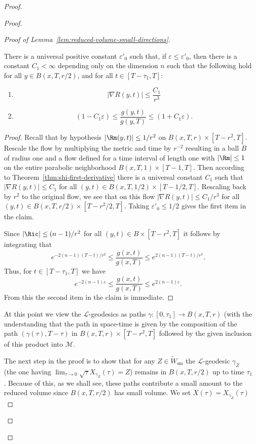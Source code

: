 \begin{proof}
\begin{proof}
\begin{proof}[Proof of Lemma~\ref{lem:reduced-volume-small-directions}]
\begin{claim}\label{claim:scalar-curvature-gradient-metric-bound}
\label{nabR}
There is a universal positive constant $\varepsilon'_0$ such that, if
$\varepsilon\le \varepsilon'_0$, then there is a constant $C_1<\infty$
depending only on the dimension $n$ such that the following hold for all $y\in
B(x,T,r/2)$, and for all $t\in[T-\tau_1,T]$:
\begin{enumerate}
\item[(1)] $$|\nabla R(y,t)|\le \frac{C_1}{r^3}$$
\item[(2)]  $$(1-C_1\varepsilon)\le \frac{g(y,t)}{g(y,T)}\le (1+C_1\varepsilon).$$
\end{enumerate}
\end{claim}

\begin{proof}
Recall that by hypothesis $|\Rm(y,t)|\le 1/r^2$ on
$B(x,T,r)\times [T-r^2,T]$. Rescale the flow by multiplying the
metric and time by $r^{-2}$ resulting in a ball $\widetilde B$ of
radius one and a flow defined for a time interval of length one with
$|\Rm|\le 1$ on the entire parabolic neighborhood
$B(x,T,1)\times [T-1,T]$. Then according to Theorem~\ref{thm:shi-first-derivative} there
is a universal constant $C_1$ such that $|\nabla R(y,t)|\le C_1$ for
all $(y,t)\in B(x,T,1/2)\times [T-1/2,T]$. Rescaling back by $r^2$
to the original flow, we see that on this flow $|\nabla R(y,t)|\le
C_1/r^3$ for all $(y,t)\in B(x,T,r/2)\times [T-r^2/2,T]$. Taking
$\varepsilon'_0\le 1/2$ gives the first item in the claim.

 Since  $|\Ric|\le (n-1)/r^2$ for all
$(y,t)\in B\times[T-r^2,T]$ it follows by integrating that
$$e^{-2(n-1)(T-t)/r^2}\le \frac{g(x,t)}{g(x,T)}\le e^{2(n-1)(T-t)/r^2}.$$
Thus, for $t\in [T-\tau_1,T]$ we have
$$e^{-2(n-1)\varepsilon}\le \frac{g(x,t)}{g(x,T)}\le e^{2(n-1)\varepsilon}.$$
From this the second item in the claim is immediate.
\end{proof}

At this point we view the ${\mathcal L}$-geodesics as paths
$\gamma\colon [0,\tau_1]\to B(x,T,r)$ (with the understanding that
the path in space-time is given by the composition of the path $
(\gamma(\tau),T-\tau)$ in $B(x,T,r)\times [T-r^2,T]$ followed by the
given inclusion of this product into ${\mathcal M}$.


The next step in the  proof is to show that for any $Z\in \widetilde
W_{\mathrm{sm}}$ the ${\mathcal L}$-geodesic $\gamma_Z$ (the one having
$\lim_{\tau\rightarrow 0}\sqrt\tau X_{\gamma_Z}(\tau)=Z$)
remains in $B(x,T,r/2)$ up to time $\tau_1$. Because of this, as we
shall see, these paths contribute a small amount to the reduced
volume since $B(x,T,r/2)$ has small volume. We set
$X(\tau)=X_{\gamma_Z}(\tau)$



\end{proof}
\end{proof}
\end{proof}
